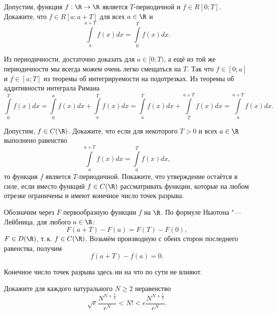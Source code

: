 \begin{problem}[14]
    Допустим, функция $f: \R \to \R$ является $T$-периодичной и $f \in R[0; T]$. Докажите, что $f \in R[a; a + T]$ для всех $a \in \R$ и
    \[
        \int\limits_a^{a + T}f(x)dx = \int\limits_0^Tf(x)dx.
    \]
\end{problem}

\begin{solution}
    Из периодичности, достаточно доказать для $a \in [0; T)$, а ещё из той же периодичности мы всегда можем очень легко смещаться на $T$. Так что $f \in [0; a]$ и $f \in [a; T]$ из теоремы об интегрируемости на подотрезках. Из теоремы об аддитивности интеграла Римана
    \[
        \int\limits_0^Tf(x)dx = \int\limits_0^af(x)dx + \int\limits_a^Tf(x)dx = \int\limits_a^Tf(x)dx + \int\limits_T^{a + T}f(x)dx = \int\limits_a^{a + T}f(x)dx.
    \]
\end{solution}

\begin{problem}[15]
    Допустим, $f \in C(\R)$. Докажите, что если для некоторого $T > 0$ и всех $a \in \R$ выполнено равенство
    \[
        \int\limits_a^{a + T}f(x)dx = \int\limits_0^Tf(x)dx,
    \]
    то функция $f$ является $T$-периодичной. Покажите, что утверждение остаётся в силе, если вместо функций $f \in C(\R)$ рассматривать функции, которые на любом отрезке ограничены и имеют конечное число точек разрыва.
\end{problem}

\begin{solution}
    Обозначим через $F$ первообразную функции $f$ на $\R$. По формуле Ньютона "---Лейбница, для любого $a \in \R$:
    \[
        F(a + T) - F(a) = F(T) - F(0),
    \]
    $F \in D(\R)$, т.\,к. $f \in C(\R)$. Возьмём производную с обеих сторон последнего равенства, получим
    \[
        f(a + T) - f(a) = 0.
    \]

    Конечное число точек разрыва здесь ни на что по сути не влияют.
\end{solution}

\begin{problem}[16]
    Докажите для каждого натурального $N \geqslant 2$ неравенство
    \[
        \sqrt{e}\frac{N^{N + \frac{1}{2}}}{e^N} < N! < e\frac{N^{N + \frac{1}{2}}}{e^N}.
    \]
\end{problem}

